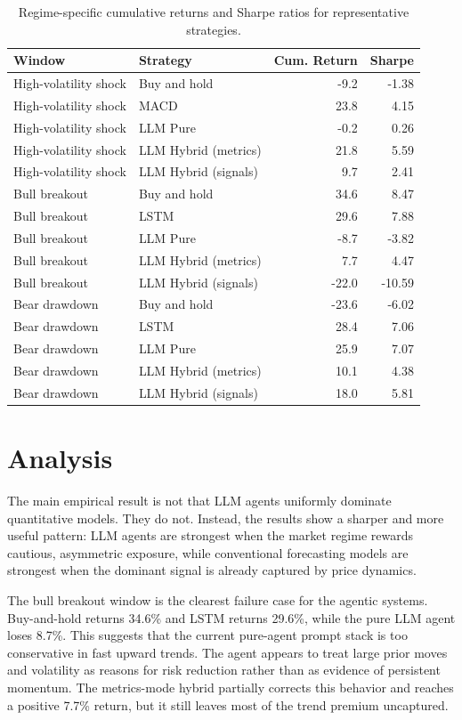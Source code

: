 \begin{table}[h]
\centering
\caption{Regime-specific cumulative returns and Sharpe ratios for representative strategies.}
\label{tab:regime_results}
\begin{tabular}{llrr}
\toprule
Window & Strategy & Cum. Return & Sharpe \\
\midrule
High-volatility shock & Buy and hold & -9.2 & -1.38 \\
High-volatility shock & MACD & 23.8 & 4.15 \\
High-volatility shock & LLM Pure & -0.2 & 0.26 \\
High-volatility shock & LLM Hybrid (metrics) & 21.8 & 5.59 \\
High-volatility shock & LLM Hybrid (signals) & 9.7 & 2.41 \\
\midrule
Bull breakout & Buy and hold & 34.6 & 8.47 \\
Bull breakout & LSTM & 29.6 & 7.88 \\
Bull breakout & LLM Pure & -8.7 & -3.82 \\
Bull breakout & LLM Hybrid (metrics) & 7.7 & 4.47 \\
Bull breakout & LLM Hybrid (signals) & -22.0 & -10.59 \\
\midrule
Bear drawdown & Buy and hold & -23.6 & -6.02 \\
Bear drawdown & LSTM & 28.4 & 7.06 \\
Bear drawdown & LLM Pure & 25.9 & 7.07 \\
Bear drawdown & LLM Hybrid (metrics) & 10.1 & 4.38 \\
Bear drawdown & LLM Hybrid (signals) & 18.0 & 5.81 \\
\bottomrule
\end{tabular}
\end{table}

\section{Analysis}

The main empirical result is not that LLM agents uniformly dominate quantitative models.  They do not.  Instead, the results show a sharper and more useful pattern: LLM agents are strongest when the market regime rewards cautious, asymmetric exposure, while conventional forecasting models are strongest when the dominant signal is already captured by price dynamics.

The bull breakout window is the clearest failure case for the agentic systems.  Buy-and-hold returns 34.6\% and LSTM returns 29.6\%, while the pure LLM agent loses 8.7\%.  This suggests that the current pure-agent prompt stack is too conservative in fast upward trends.  The agent appears to treat large prior moves and volatility as reasons for risk reduction rather than as evidence of persistent momentum.  The metrics-mode hybrid partially corrects this behavior and reaches a positive 7.7\% return, but it still leaves most of the trend premium uncaptured.

